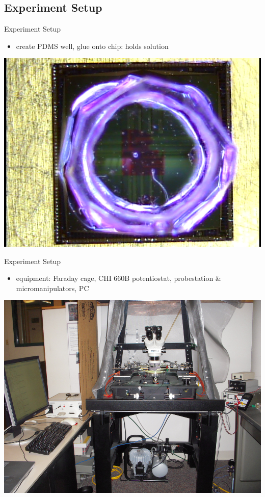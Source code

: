 \documentclass[10pt]{beamer}
\begin{document}
\subsection{Experiment Setup}
\begin{frame}{Experiment Setup}
	\begin{itemize}
		\item create PDMS well, glue onto chip: holds solution
	\end{itemize}
	\includegraphics[width=\linewidth]{figures/chip-top.png}
\end{frame}

\begin{frame}{Experiment Setup}
	\begin{itemize}
		\item equipment: Faraday cage, CHI 660B potentiostat, probestation \& micromanipulators, PC
	\end{itemize}
	\includegraphics[width=0.95\linewidth]{figures/probestation.png}
\end{frame}
\end{document}
